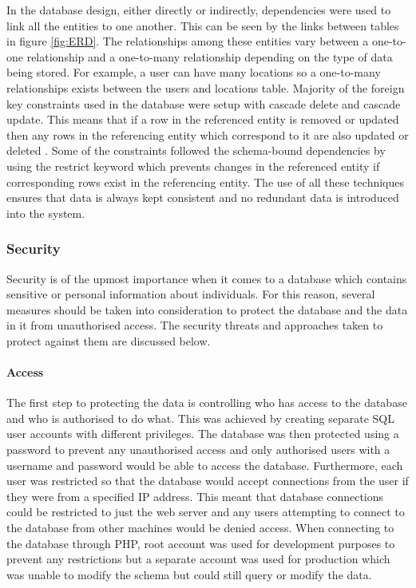 In the database design, either directly or indirectly, dependencies were used to link all the entities to one another. This can be seen by the links between tables in figure \ref{fig:ERD}. The relationships among these entities vary between a one-to-one relationship and a one-to-many relationship depending on the type of data being stored. For example, a user can have many locations so a one-to-many relationships exists between the users and locations table. Majority of the foreign key constraints used in the database were setup with cascade delete and cascade update. This means that if a row in the referenced entity is removed or updated then any rows in the referencing entity which correspond to it are also updated or deleted \cite{TechOnTheNet:Cascading}. Some of the constraints followed the schema-bound dependencies by using the restrict keyword which prevents changes in the referenced entity if corresponding rows exist in the referencing entity. The use of all these techniques ensures that data is always kept consistent and no redundant data is introduced into the system.

\subsubsection{Security}
Security is of the upmost importance when it comes to a database which contains sensitive or personal information about individuals. For this reason, several measures should be taken into consideration to protect the database and the data in it from unauthorised access. The security threats and approaches taken to protect against them are discussed below.

\paragraph{Access}
The first step to protecting the data is controlling who has access to the database and who is authorised to do what. This was achieved by creating separate SQL user accounts with different privileges. The database was then protected using a password to prevent any unauthorised access and only authorised users with a username and password would be able to access the database. Furthermore, each user was restricted so that the database would accept connections from the user if they were from a specified IP address. This meant that database connections could be restricted to just the web server and any users attempting to connect to the database from other machines would be denied access. When connecting to the database through PHP, root account was used for development purposes to prevent any restrictions but a separate account was used for production which was unable to modify the schema but could still query or modify the data.

